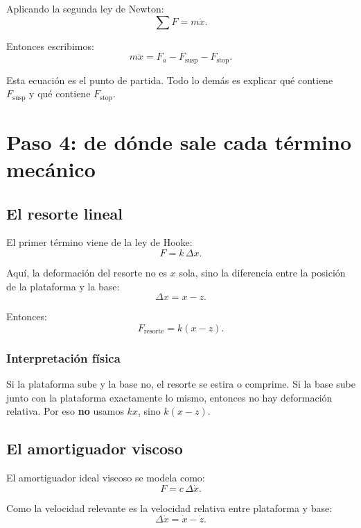 \documentclass[11pt]{article}
\begin{document}
Aplicando la segunda ley de Newton:
\begin{equation}
\sum F = m\ddot{x}.
\end{equation}

Entonces escribimos:
\begin{equation}
m\ddot{x} = F_a - F_{\text{susp}} - F_{\text{stop}}.
\label{eq:base}
\end{equation}

Esta ecuaci\'on es el punto de partida. Todo lo dem\'as es explicar qu\'e contiene $F_{\text{susp}}$ y qu\'e contiene $F_{\text{stop}}$.

\section{Paso 4: de d\'onde sale cada t\'ermino mec\'anico}

\subsection{El resorte lineal}

El primer t\'ermino viene de la ley de Hooke:
\[
F = k\,\Delta x.
\]

Aqu\'i, la deformaci\'on del resorte no es $x$ sola, sino la diferencia entre la posici\'on de la plataforma y la base:
\[
\Delta x = x-z.
\]

Entonces:
\begin{equation}
F_{\text{resorte}} = k(x-z).
\label{eq:hooke}
\end{equation}

\subsubsection{Interpretaci\'on f\'isica}

Si la plataforma sube y la base no, el resorte se estira o comprime. Si la base sube junto con la plataforma exactamente lo mismo, entonces no hay deformaci\'on relativa. Por eso \textbf{no} usamos $kx$, sino $k(x-z)$.

\subsection{El amortiguador viscoso}

El amortiguador ideal viscoso se modela como:
\[
F = c\,\Delta \dot{x}.
\]

Como la velocidad relevante es la velocidad relativa entre plataforma y base:
\[
\Delta \dot{x} = \dot{x}-\dot{z}.
\]
\end{document}
